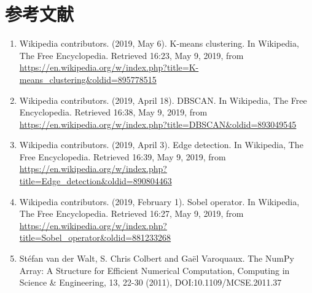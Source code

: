 \documentclass[a4paper, 12pt]{article}
\begin{document}
\section{参考文献}

\begin{enumerate}
\item Wikipedia contributors. (2019, May 6). K-means clustering. In Wikipedia, The Free Encyclopedia. Retrieved 16:23, May 9, 2019, from \url{https://en.wikipedia.org/w/index.php?title=K-means_clustering&oldid=895778515}
\item Wikipedia contributors. (2019, April 18). DBSCAN. In Wikipedia, The Free Encyclopedia. Retrieved 16:38, May 9, 2019, from \url{https://en.wikipedia.org/w/index.php?title=DBSCAN&oldid=893049545}
\item Wikipedia contributors. (2019, April 3). Edge detection. In Wikipedia, The Free Encyclopedia. Retrieved 16:39, May 9, 2019, from \url{https://en.wikipedia.org/w/index.php?title=Edge_detection&oldid=890804463}
\item Wikipedia contributors. (2019, February 1). Sobel operator. In Wikipedia, The Free Encyclopedia. Retrieved 16:27, May 9, 2019, from \url{https://en.wikipedia.org/w/index.php?title=Sobel_operator&oldid=881233268}
\item Stéfan van der Walt, S. Chris Colbert and Gaël Varoquaux. The NumPy Array: A Structure for Efficient Numerical Computation, Computing in Science \& Engineering, 13, 22-30 (2011), DOI:10.1109/MCSE.2011.37
\end{enumerate}
\end{document}
